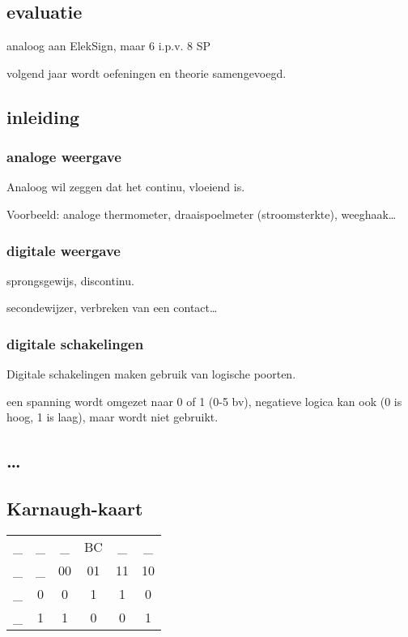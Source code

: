 \documentclass[11pt, a4paper]{article}
\begin{document}
\subsection{evaluatie}

analoog aan ElekSign, maar 6 i.p.v. 8 SP

volgend jaar wordt oefeningen en theorie samengevoegd.

\subsection{inleiding}

\subsubsection{analoge weergave}

Analoog wil zeggen dat het continu, vloeiend is.

Voorbeeld: analoge thermometer, draaispoelmeter (stroomsterkte), weeghaak\dots

\subsubsection{digitale weergave}

sprongsgewijs, discontinu.

secondewijzer, verbreken van een contact\dots

\subsubsection{digitale schakelingen}

Digitale schakelingen maken gebruik van logische poorten.

een spanning wordt omgezet naar 0 of 1 (0-5 bv), negatieve logica kan ook (0 is hoog, 1 is laag), maar wordt niet gebruikt.

\subsection{\dots}

\subsection{Karnaugh-kaart}

\begin{tabular}{c c | c | c | c | c |}
  \_ & \_ & \_ & BC & \_ & \_\\
  \_ & \_ & 00 & 01 & 11 & 10 \\
   \hline
   \_ & 0 &  0 & 1 & 1 & 0 \\
   \hline
   \_ & 1 &  1 & 0 & 0 & 1 \\
   \hline
\end{tabular}
\end{document}

